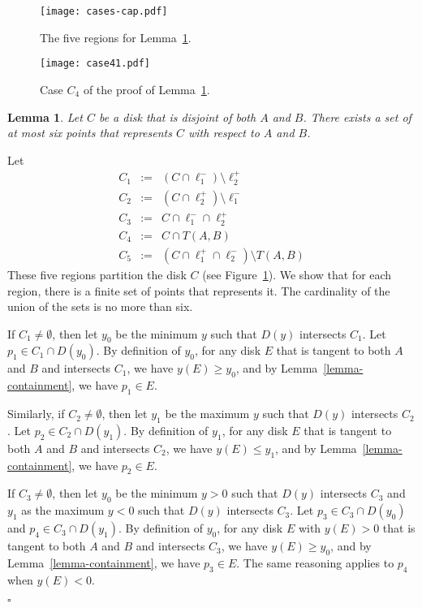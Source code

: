\documentclass[pdftex,leqno,fleqn,12pt]{article}
\newtheorem{lemma}[theorem]{Lemma}
\newenvironment{proof}{{\textit Proof:} \rm}{\hfill $\square$ \medskip\\}
\begin{document}
\begin{figure}
\centering\texttt{[image: cases-cap.pdf]}\caption{The five regions for
Lemma~\ref{lemma-repr}.}\label{fig-lemma-repr}
\end{figure}
\begin{figure}
\centering\texttt{[image: case41.pdf]}\caption{Case $C_4$ of the proof of
Lemma~\ref{lemma-repr}.}\label{fig-lemma-repr4}
\end{figure}
\begin{lemma}\label{lemma-repr} Let $C$ be a disk that is disjoint of both $A$ and $B$. There exists a
set of at most six points that represents $C$ with respect to $A$ and $B$.
\end{lemma}
\begin{proof} Let
\begin{eqnarray*}
C_1 & := & (C\cap\ell_1^-)\setminus\ell_2^+\\
C_2 & := & (C\cap\ell_2^+)\setminus\ell_1^-\\
C_3 & := & C\cap\ell_1^-\cap\ell_2^+\\
C_4 & := & C\cap T(A,B)\\
C_5 & := & (C\cap\ell_1^+\cap\ell_2^-)\setminus T(A,B)
\end{eqnarray*}
These five regions partition the disk $C$ (see Figure~\ref{fig-lemma-repr}). We show that for each
region, there is a finite set of points that represents it. The cardinality of the union of the
sets is no more than six.

If $C_1\neq\emptyset$, then let $y_0$ be the minimum $y$ such that $D(y)$ intersects $C_1$. Let
$p_1\in C_1\cap D(y_0)$. By definition of $y_0$, for any disk $E$ that is tangent to both $A$ and $B$
and intersects $C_1$, we have $y(E)\geq y_0$, and by Lemma~\ref{lemma-containment}, we have $p_1\in
E$.

Similarly, if $C_2\neq\emptyset$, then let $y_1$ be the maximum $y$ such that $D(y)$ intersects
$C_2$. Let $p_2\in C_2\cap D(y_1)$. By definition of $y_1$, for any disk $E$ that is tangent to both $A$
and $B$ and intersects $C_2$, we have $y(E)\leq y_1$, and by Lemma~\ref{lemma-containment}, we have
$p_2\in E$.

If $C_3\neq\emptyset$, then let $y_0$ be the minimum $y>0$ such that $D(y)$ intersects $C_3$ and
$y_1$ as the maximum $y<0$ such that $D(y)$ intersects $C_3$. Let $p_3\in C_3\cap D(y_0)$ and
$p_4\in C_3\cap D(y_1)$. By definition of $y_0$, for any disk $E$ with $y(E)>0$ that is tangent to both
$A$ and $B$ and intersects $C_3$, we have $y(E)\geq y_0$, and by Lemma~\ref{lemma-containment}, we
have $p_3\in E$. The same reasoning applies to $p_4$ when $y(E)<0$.


\end{proof}
\end{document}
